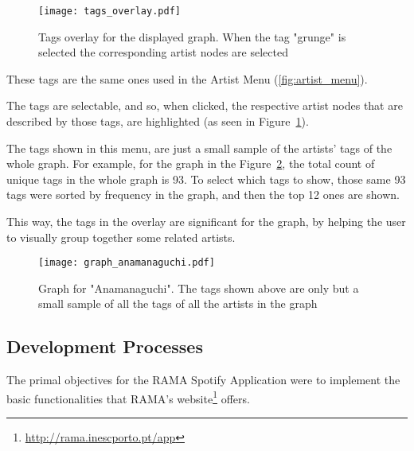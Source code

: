       \begin{figure}[tb]
        \begin{center}
          \texttt{[image: tags\_overlay.pdf]}
        \end{center}
        \caption{Tags overlay for the displayed graph. When the tag "grunge" is selected the corresponding artist nodes are selected}
        \label{fig:tags_overlay}
      \end{figure}

      These tags are the same ones used in the Artist Menu (\ref{fig:artist_menu}).

      The tags are selectable, and so, when clicked, the respective artist nodes that are described by those tags, are highlighted (as seen in Figure~\ref{fig:tags_overlay}).

      The tags shown in this menu, are just a small sample of the artists' tags of the whole graph.
      For example, for the graph in the Figure~\ref{fig:graph_anamanaguchi}, the total count of unique tags in the whole graph is 93.
      To select which tags to show, those same 93 tags were sorted by frequency in the graph, and then the top 12 ones are shown.

      This way, the tags in the overlay are significant for the graph, by helping the user to visually group together some related artists.

      \begin{figure}
        \begin{center}
          \texttt{[image: graph\_anamanaguchi.pdf]}
        \end{center}
        \caption{Graph for "Anamanaguchi". The tags shown above are only but a small sample of all the tags of all the artists in the graph}
        \label{fig:graph_anamanaguchi}
      \end{figure}




  \subsection{Development Processes} %
    \label{sub:development_process}

    The primal objectives for the RAMA Spotify Application were to implement the basic functionalities that RAMA's website\footnote{\url{http://rama.inescporto.pt/app}} offers.


